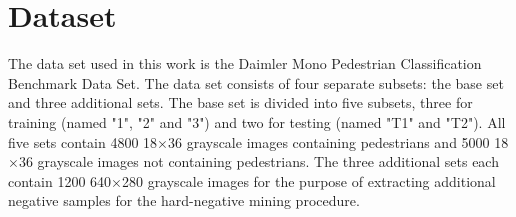 \documentclass[journal,twocolumn]{IEEEtran}
\begin{document}
\section{Dataset}
\label{sec:data}

The data set used in this work is the Daimler Mono Pedestrian Classification Benchmark Data Set\cite{3}. The data set consists of four separate subsets: the base set and three additional sets. The base set is divided into five subsets, three for training (named "1", "2" and "3") and two for testing (named "T1" and "T2"). All five sets contain 4800 18$\times$36 grayscale images containing pedestrians and 5000 18$\times$36 grayscale images not containing pedestrians. The three additional sets each contain 1200 640$\times$280 grayscale images for the purpose of extracting additional negative samples for the hard-negative mining procedure.
\end{document}
